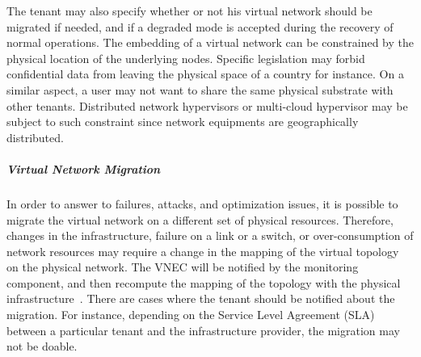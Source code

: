 The tenant may also specify whether or not his virtual network should be migrated if needed, and if a degraded mode is accepted during the recovery of normal operations.
The embedding of a virtual network can be constrained by the physical location of the underlying nodes.
Specific legislation may forbid confidential data from leaving the physical space of a country for instance.
On a similar aspect, a user may not want to share the same physical substrate with other tenants.
Distributed network hypervisors or multi-cloud hypervisor may be subject to such constraint since network equipments are geographically distributed.



\subparagraph{Virtual Network Migration}
In order to answer to failures, attacks, and optimization issues, it is possible to migrate the virtual network on a different set of physical resources. 
Therefore, changes in the infrastructure, failure on a link or a switch, or over-consumption of network resources may require a change in the mapping of the virtual topology on the physical network.
The VNEC will be notified by the monitoring component, and then recompute the mapping of the topology with the physical infrastructure~\cite{VeRTIGO-Corin2012a,AutoSlice-Bozakov2012,CoVisor-Jin2015}.
There are cases where the tenant should be notified about the migration.
For instance, depending on the Service Level Agreement (SLA) between a particular tenant and the infrastructure provider, the migration may not be doable.

